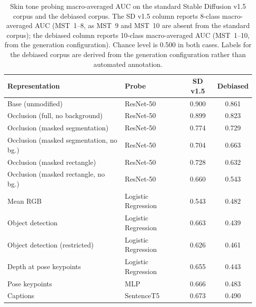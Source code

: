\begin{table}[htbp]
	\centering
	\begin{tabular}{llcc}
		\toprule
		\textbf{Representation}                 & \textbf{Probe}      & \textbf{SD v1.5} & \textbf{Debiased} \\
		\midrule
		Base (unmodified)                       & ResNet-50           & 0.900            & 0.861             \\
		Occlusion (full, no background)         & ResNet-50           & 0.899            & 0.823             \\
		Occlusion (masked segmentation)         & ResNet-50           & 0.774            & 0.729             \\
		Occlusion (masked segmentation, no bg.) & ResNet-50           & 0.704            & 0.663             \\
		Occlusion (masked rectangle)            & ResNet-50           & 0.728            & 0.632             \\
		Occlusion (masked rectangle, no bg.)    & ResNet-50           & 0.660            & 0.543             \\
		\midrule
		Mean RGB                                & Logistic Regression & 0.543            & 0.482             \\
		Object detection                        & Logistic Regression & 0.663            & 0.439             \\
		Object detection (restricted)           & Logistic Regression & 0.626            & 0.461             \\
		Depth at pose keypoints                 & Logistic Regression & 0.655            & 0.443             \\
		Pose keypoints                          & MLP                 & 0.666            & 0.483             \\
		Captions                                & SentenceT5          & 0.673            & 0.490             \\
		\bottomrule
	\end{tabular}
	\caption{Skin tone probing macro-averaged AUC on the standard Stable
		Diffusion v1.5 corpus and the debiased corpus. The SD v1.5 column reports
		8-class macro-averaged AUC (MST~1--8, as MST~9 and MST~10 are absent from
		the standard corpus); the debiased column reports 10-class macro-averaged AUC
		(MST~1--10, from the generation configuration). Chance level is 0.500 in both
		cases. Labels for the debiased corpus are derived from the generation
		configuration rather than automated annotation.}
	\label{tab:debias_skintone_probing}
\end{table}

